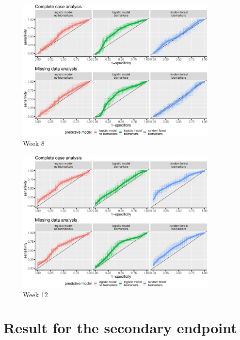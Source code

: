 \documentclass[12pt]{article}
\begin{document}
\begin{figure}[!h]
\centering
\includegraphics[trim={0 0 0 0},width=0.9\textwidth]{./../figures/ROC-pred-week8.pdf}
\caption{\label{fig:perfW8-ROC}Week 8}
\end{figure}

\begin{figure}[!h]
\centering
\includegraphics[trim={0 0 0 0},width=0.9\textwidth]{./../figures/ROC-pred-week12.pdf}
\caption{\label{fig:perfW12-ROC}Week 12}
\end{figure}


\clearpage
\section{Result for the secondary endpoint}
\label{appendix:trajectory}
\end{document}
